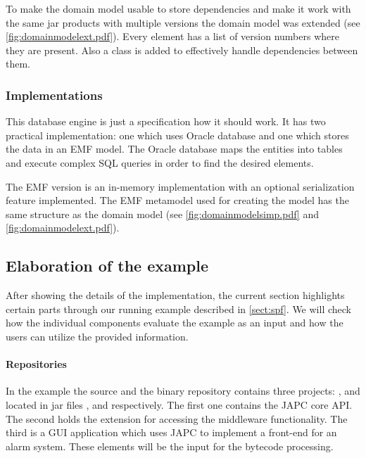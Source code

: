 To make the domain model usable to store dependencies and make it work with the
same jar products with multiple versions the domain model was extended (see
\autoref{fig:domainmodelext.pdf}).  Every element has a list of version numbers where they are
present. Also a  class is added to effectively handle
dependencies between them.

\subsubsection{Implementations}
This database engine is just a specification how it should work. It has two
practical implementation: one which uses Oracle database and one which stores
the data in an EMF model. The Oracle database maps the entities into tables and
execute complex SQL queries in order to find the desired elements.

The EMF version is an in-memory implementation with an optional serialization
feature implemented. The EMF metamodel used for creating the model has the same
structure as the domain model (see \autoref{fig:domainmodelsimp.pdf} and
\autoref{fig:domainmodelext.pdf}).



\subsection{Elaboration of the example}\label{sect:elabex1}
After showing the details of the implementation, the current section highlights
certain parts through our running example described in \autoref{sect:spf}.
We will check how the individual components evaluate the example as an input and
how the users can utilize the provided information. 

\paragraph{Repositories}
In the example the source and the binary repository contains three pro\-jects:
,  and  located in jar
files ,  and
 respectively. The first one contains the JAPC core
API. The second holds the extension for accessing the middleware functionality.
The third is a GUI application which uses JAPC to implement a front-end for an
alarm system. These elements will be the input for the bytecode processing.

